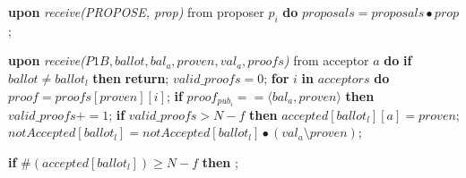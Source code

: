 \begin{algorithm}
\begin{algorithmic}[1]
		\State
		\State \textbf{upon} \textit{receive(PROPOSE, prop)} from proposer $p_i$ \textbf{do} 
		\State \hspace{\algorithmicindent} $proposals = proposals \bullet prop$;
		
		\State
		\State \textbf{upon} \textit{receive($P1B, ballot, bal_a, proven,val_a, proofs$)} from acceptor $a$ \textbf{do}
		\State \hspace{\algorithmicindent} \textbf{if} $ballot \neq ballot_l$ \textbf{then}
		\State \hspace{\algorithmicindent}\hspace{\algorithmicindent} \textbf{return};
		\State
		\State \hspace{\algorithmicindent} $valid\_proofs = 0$; 
		\State \hspace{\algorithmicindent} \textbf{for} $i$ \textbf{in} $acceptors$ \textbf{do}
		\State \hspace{\algorithmicindent}\hspace{\algorithmicindent} $proof = proofs[proven][i]$;
		\State \hspace{\algorithmicindent}\hspace{\algorithmicindent} \textbf{if} $proof_{pub_i} == \langle bal_a, proven \rangle$ \textbf{then}
		\State \hspace{\algorithmicindent}\hspace{\algorithmicindent}\hspace{\algorithmicindent} 
		$valid\_proofs \mathrel{+{=}} 1$;
		\State
		\State \hspace{\algorithmicindent} \textbf{if} $valid\_proofs > N-f$ \textbf{then}
		\State \hspace{\algorithmicindent}\hspace{\algorithmicindent}\hspace{\algorithmicindent} $accepted[ballot_l][a] = proven$;
		\State \hspace{\algorithmicindent}\hspace{\algorithmicindent}\hspace{\algorithmicindent}		$notAccepted[ballot_l] = notAccepted[ballot_l] \bullet (val_a \setminus proven)$;		
		
		\State 
		\State \hspace{\algorithmicindent}\hspace{\algorithmicindent} \textbf{if} $\#(accepted[ballot_l]) \geq N-f$ \textbf{then} 
		\State \hspace{\algorithmicindent}\hspace{\algorithmicindent}\hspace{\algorithmicindent} ;
		

\end{algorithmic}
\end{algorithm}
